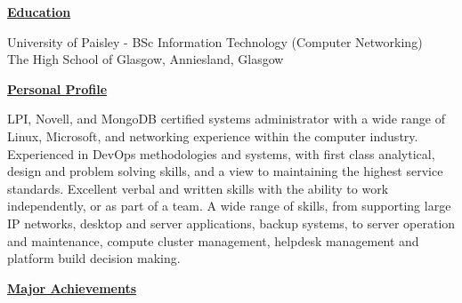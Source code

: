 \documentclass[10pt]{report}
\begin{document}


\begin{flushleft}
\bf{\underline{Education}}\\
\end{flushleft}

\begin{flushleft}
University of Paisley - BSc Information Technology (Computer Networking)\\
The High School of Glasgow, Anniesland, Glasgow\\
\end{flushleft}

\begin{flushleft}
\bf{\underline{Personal Profile}}\\
\end{flushleft}

LPI, Novell, and MongoDB certified systems administrator with a wide range of Linux, Microsoft, and networking experience within the computer industry. Experienced in DevOps methodologies and systems, with first class analytical, design and problem solving skills, and a view to maintaining the highest service standards. Excellent verbal and written skills with the ability to work independently, or as part of a team. A wide range of skills, from supporting large IP networks, desktop and server applications, backup systems, to server operation and maintenance, compute cluster management, helpdesk management and platform build decision making.

\begin{flushleft}
\bf{\underline{Major Achievements}}\\
\end{flushleft}
\end{document}
